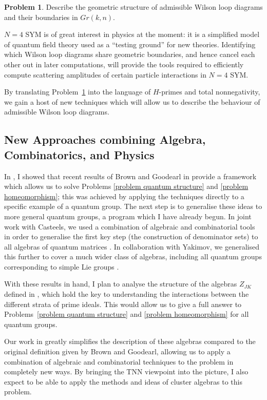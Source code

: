 \documentclass[11pt]{amsart}
\theoremstyle{definition}
\newtheorem{problem}{Problem}
\numberwithin{equation}{theorem}
\begin{document}
\begin{problem}\label{problem physics}
Describe the geometric structure of admissible Wilson loop diagrams and their boundaries in $Gr(k,n)$.
\end{problem}  

$N=4$ SYM is of great interest in physics at the moment: it is a simplified model of quantum field theory used as a ``testing ground'' for new theories.  Identifying which Wilson loop diagrams share geometric boundaries, and hence cancel each other out in later computations, will provide the tools required to efficiently compute scattering amplitudes of certain particle interactions in $N=4$ SYM.  

By translating Problem~\ref{problem physics} into the language of $H$-primes and total nonnegativity, we gain a host of new techniques which will allow us to describe the behaviour of admissible Wilson loop diagrams.

\subsection{New Approaches combining Algebra, Combinatorics, and Physics} \label{ss:my work} In \cite{Me2}, I showed that recent results of Brown and Goodearl in \cite{GBrown} provide a framework which allows us to solve Problems \ref{problem quantum structure} and \ref{problem homeomorphism}; this was achieved by applying the techniques directly to a specific example of a quantum group.  The next step is to generalise these ideas to more general quantum groups, a program which I have already begun.  In joint work with Casteels, we used a combination of algebraic and combinatorial tools in order to generalise the first key step (the construction of denominator sets) to all algebras of quantum matrices \cite{Me3}. In collaboration with Yakimov, we generalised this further to cover a much wider class of algebras, including all quantum groups corresponding to simple Lie groups \cite{MeMilen}.

With these results in hand, I plan to analyse the structure of the algebras $Z_{JK}$ defined in \cite{GBrown}, which hold the key to understanding the interactions between the different strata of prime ideals.  This would allow us to give a full answer to Problems~\ref{problem quantum structure} and \ref{problem homeomorphism} for all quantum groups.

Our work in \cite{Me3,MeMilen} greatly simplifies the description of these algebras compared to the original definition given by Brown and Goodearl, allowing us to apply a combination of algebraic and combinatorial techniques to the problem in completely new ways.  By bringing the TNN viewpoint into the picture, I also expect to be able to apply the methods and ideas of cluster algebras to this problem.
\end{document}
